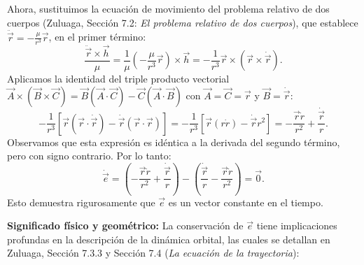 \documentclass[12pt, a4paper]{article}
\begin{document}
Ahora, sustituimos la ecuación de movimiento del problema relativo de dos cuerpos (Zuluaga, Sección 7.2: \textit{El problema relativo de dos cuerpos}), que establece $\ddot{\vec{r}} = -\frac{\mu}{r^3} \vec{r}$, en el primer término:
$$
\frac{\ddot{\vec{r}} \times \vec{h}}{\mu} = \frac{1}{\mu} \left( -\frac{\mu}{r^3} \vec{r} \right) \times \vec{h} = -\frac{1}{r^3} \vec{r} \times (\vec{r} \times \dot{\vec{r}}).
$$
Aplicamos la identidad del triple producto vectorial $\vec{A} \times (\vec{B} \times \vec{C}) = \vec{B}(\vec{A} \cdot \vec{C}) - \vec{C}(\vec{A} \cdot \vec{B})$ con $\vec{A} = \vec{C} = \vec{r}$ y $\vec{B} = \dot{\vec{r}}$:
$$
-\frac{1}{r^3} \left[ \vec{r}(\vec{r} \cdot \dot{\vec{r}}) - \dot{\vec{r}}(\vec{r} \cdot \vec{r}) \right] = -\frac{1}{r^3} \left[ \vec{r}(r \dot{r}) - \dot{\vec{r}} r^2 \right] = -\frac{\vec{r} \dot{r}}{r^2} + \frac{\dot{\vec{r}}}{r}.
$$
Observamos que esta expresión es idéntica a la derivada del segundo término, pero con signo contrario. Por lo tanto:
$$
\dot{\vec{e}} = \left( -\frac{\vec{r} \dot{r}}{r^2} + \frac{\dot{\vec{r}}}{r} \right) - \left( \frac{\dot{\vec{r}}}{r} - \frac{\vec{r} \dot{r}}{r^2} \right) = \vec{0}.
$$
Esto demuestra rigurosamente que $\vec{e}$ es un vector constante en el tiempo.

\textbf{Significado físico y geométrico:}
La conservación de $\vec{e}$ tiene implicaciones profundas en la descripción de la dinámica orbital, las cuales se detallan en Zuluaga, Sección 7.3.3 y Sección 7.4 (\textit{La ecuación de la trayectoria}):
\end{document}
